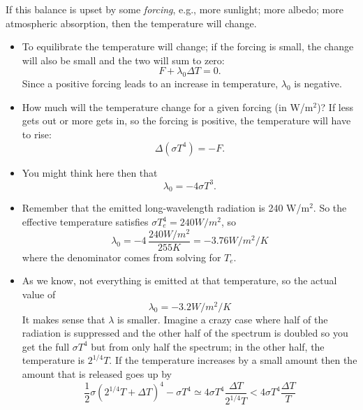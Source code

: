 \documentclass[11pt]{book}
\def\be{\begin{equation}}
\def\ee{\end{equation}}
\newcommand{\eql}[1]{\label{eq:#1}}
\newcommand\bei{\begin{itemize}}
\newcommand\eei{\end{itemize}}
\begin{document}
If this balance is upset by some {\it forcing}, e.g., more sunlight; more albedo; more atmospheric absorption, then the temperature will change. 
\bei
\item To equilibrate the temperature will change; if the forcing is small, the change will also be small and the two will sum to zero:
\be
F + \lambda_0 \Delta T = 0.\ee
Since a positive forcing leads to an increase in temperature, $\lambda_0$ is negative.
\item How much will the temperature change for a given forcing (in W/m$^2$)? If less gets out or more gets in, so the forcing is positive, the temperature will have to rise:
\be
\Delta(\sigma T^4) = -F.\ee
\item You might think here then that
\be
\lambda_0 = -4\sigma T^3.\ee
\item Remember that the emitted long-wavelength radiation is 240 W/m$^2$. So the effective temperature satisfies $\sigma T_e^4=240W/m^2$, so
\be
\lambda_0= -4\,\frac{240 W/m^2}{255K} = -3.76 W/m^2/K\ee
where the denominator comes from solving for $T_e$.
\item As we know, not everything is emitted at that temperature, so the actual value of 
\be
\lambda_0=-3.2 W/m^2/K\eql{lambda}\ee
It makes sense that $\lambda$ is smaller. Imagine a crazy case where half of the radiation is suppressed and the other half of the spectrum is doubled so you get the full $\sigma T^4$ but from only half the spectrum; in the other half, the temperature is $2^{1/4} T$. If the temperature increases by a small amount then the amount that is released goes up by 
\be
\frac12\sigma(2^{1/4} T + \Delta T)^4 - \sigma T^4  \simeq 4\sigma T^4 \frac{\Delta T}{2^{1/4} T} < 4\sigma T^4\frac{\Delta T}{T} \ee
\eei
\end{document}
